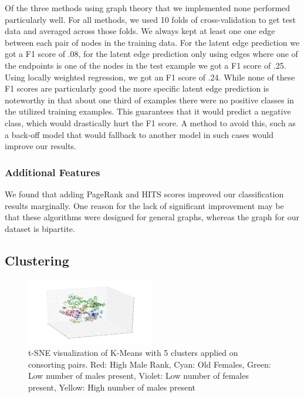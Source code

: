 \documentclass[twoside,twocolumn,paper=letter,fontsize=11pt]{article}
\begin{document}
Of the three methods using graph theory that we implemented none performed
particularly well. For all methods, we used 10 folds of cross-validation
to get test data and averaged across those folds. We always kept at least one
one edge between each pair of nodes in the training data. For the latent edge
prediction we got a F1 score of .08, for the latent edge prediction only using
edges where one of the endpoints is one of the nodes in the test example we got
a F1 score of .25. Using locally weighted regression, we got an F1 score of
.24. While none of these F1 scores are particularly good the more specific
latent edge prediction is noteworthy in that about one third of examples there
were no positive classes in the utilized training examples. This guarantees
that it would predict a negative class, which would drastically hurt the F1
score. A method to avoid this, such as a back-off model that would
fallback to another model in such cases would improve our results.\\

\subsubsection*{Additional Features}


We found that adding PageRank and HITS scores improved our classification
results marginally. One reason for the lack of significant improvement may be
that these algorithms were designed for general graphs, whereas the graph for
our dataset is bipartite. 


\subsection{Clustering}
\begin{figure}[h]
      \centering
          \includegraphics[width=0.5\textwidth]{../figs/consort_kmeans_5_3d_tsne.png}
  \caption{t-SNE visualization of K-Means with 5 clusters applied on consorting
  pairs. Red: High Male Rank, Cyan: Old Females, Green: Low number of males
present, Violet: Low number of females present, Yellow: High number of males
present}
  \label{fig:consort_clustering_vis}
\end{figure}
\end{document}
